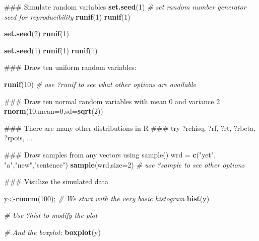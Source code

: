 \documentclass[12pt,]{book}
\newenvironment{Shaded}{\begin{snugshade}}{\end{snugshade}}
\newcommand{\KeywordTok}[1]{\textcolor[rgb]{0.13,0.29,0.53}{\textbf{#1}}}
\newcommand{\DataTypeTok}[1]{\textcolor[rgb]{0.13,0.29,0.53}{#1}}
\newcommand{\DecValTok}[1]{\textcolor[rgb]{0.00,0.00,0.81}{#1}}
\newcommand{\StringTok}[1]{\textcolor[rgb]{0.31,0.60,0.02}{#1}}
\newcommand{\CommentTok}[1]{\textcolor[rgb]{0.56,0.35,0.01}{\textit{#1}}}
\newcommand{\NormalTok}[1]{#1}
\begin{document}
\begin{Shaded}
\begin{Highlighting}[]
\NormalTok{### Simulate random variables }
\KeywordTok{set.seed}\NormalTok{(}\DecValTok{1}\NormalTok{) }\CommentTok{# set random number generator seed for reproducibility}
\KeywordTok{runif}\NormalTok{(}\DecValTok{1}\NormalTok{)}
\KeywordTok{runif}\NormalTok{(}\DecValTok{1}\NormalTok{) }

\KeywordTok{set.seed}\NormalTok{(}\DecValTok{2}\NormalTok{)}
\KeywordTok{runif}\NormalTok{(}\DecValTok{1}\NormalTok{)}

\KeywordTok{set.seed}\NormalTok{(}\DecValTok{1}\NormalTok{)}
\KeywordTok{runif}\NormalTok{(}\DecValTok{1}\NormalTok{)}
\KeywordTok{runif}\NormalTok{(}\DecValTok{1}\NormalTok{)}


\NormalTok{### Draw ten uniform random variables:}

\KeywordTok{runif}\NormalTok{(}\DecValTok{10}\NormalTok{)}
\CommentTok{# use ?runif to see what other options are available }

\NormalTok{### Draw ten normal random variables with mean 0 and variance 2}
\KeywordTok{rnorm}\NormalTok{(}\DecValTok{10}\NormalTok{,}\DataTypeTok{mean=}\DecValTok{0}\NormalTok{,}\DataTypeTok{sd=}\KeywordTok{sqrt}\NormalTok{(}\DecValTok{2}\NormalTok{))}

\NormalTok{### There are many other distributions in R}
\NormalTok{### try ?rchisq, ?rf, ?rt, ?rbeta, ?rpois, ...}

\NormalTok{### Draw samples from any vectors using sample()}
\NormalTok{wrd =}\StringTok{ }\KeywordTok{c}\NormalTok{(}\StringTok{"yet"}\NormalTok{, }\StringTok{"a"}\NormalTok{,}\StringTok{"new"}\NormalTok{,}\StringTok{"sentence"}\NormalTok{)}
\KeywordTok{sample}\NormalTok{(wrd,}\DataTypeTok{size=}\DecValTok{2}\NormalTok{)}
\CommentTok{# use ?sample to see other options}
\end{Highlighting}
\end{Shaded}

\begin{Shaded}
\begin{Highlighting}[]
\NormalTok{### Visulize the simulated data}

\NormalTok{y<-}\KeywordTok{rnorm}\NormalTok{(}\DecValTok{100}\NormalTok{);}
\CommentTok{# We start with the very basic histogram }
\KeywordTok{hist}\NormalTok{(y)}
\end{Highlighting}
\end{Shaded}

\begin{Shaded}
\begin{Highlighting}[]
\CommentTok{# Use ?hist to modify the plot }

\CommentTok{# And the boxplot:}
\KeywordTok{boxplot}\NormalTok{(y)}
\end{Highlighting}
\end{Shaded}
\end{document}
